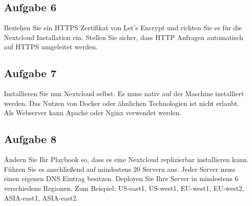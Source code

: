 \documentclass{article}
\begin{document}
    \subsection{Aufgabe 6}
    Beziehen Sie ein HTTPS Zertifikat von Let's Encrypt und richten Sie es für die Nextcloud Installation ein.
    Stellen Sie sicher, dass HTTP Anfragen automatisch auf HTTPS umgeleitet werden.

    \subsection{Aufgabe 7}
    Installieren Sie nun Nextcloud selbst. Es muss nativ auf der Maschine installiert werden.
    Das Nutzen von Docker oder ähnlichen Technologien ist nicht erlaubt. Als Webserver kann Apache oder Nginx verwendet werden.

    \subsection{Aufgabe 8}
    Ändern Sie Ihr Playbook so, dass es eine Nextcloud replizierbar installieren kann.
    Führen Sie es anschließend auf mindestens 20 Servern aus. Jeder Server muss einen eigenen DNS Eintrag besitzen.
    Deployen Sie Ihre Server in mindestens 6 verschiedene Regionen. Zum Beispiel: US-east1, US-west1, EU-west1, EU-west2, ASIA-east1, ASIA-east2.
\end{document}
